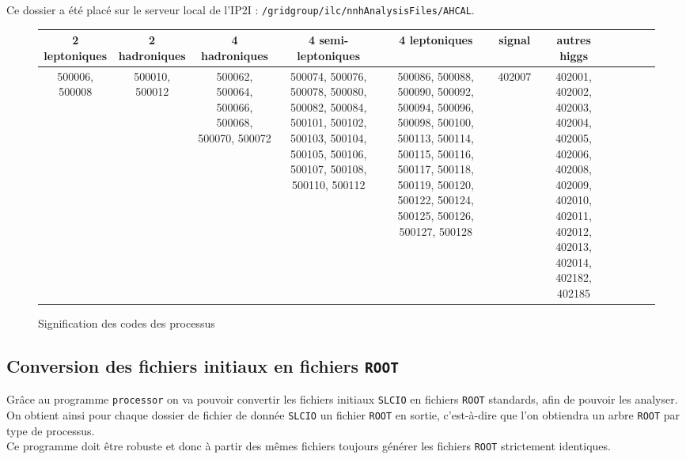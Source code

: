 \documentclass[10pt,a4paper]{report}
\newcommand{\cad}{c'est-à-dire\xspace}
\newcommand{\ROOT}{\texttt{ROOT}\xspace}
\newcommand{\SLCIO}{\texttt{SLCIO}\xspace}
\newcommand{\processor}{\texttt{processor}\xspace}
\begin{document}
Ce dossier a été placé sur le serveur local de l'IP2I : \texttt{/gridgroup/ilc/nnhAnalysisFiles/AHCAL}.

\begin{figure}[h!]
    \centering
    \begin{tabular}{ | c | c | c | c | c | c | c | c | c | c | c | }
        \hline
        2 leptoniques & 2 hadroniques & 4 hadroniques & 4 semi-leptoniques & 4 leptoniques & signal & autres higgs \\
        \hline
        500006, 500008 & 500010, 500012 & 500062, 500064, 500066, 500068, 500070, 500072 & 500074, 500076, 500078, 500080, 500082, 500084, 500101, 500102, 500103, 500104, 500105, 500106, 500107, 500108, 500110, 500112 & 500086, 500088, 500090, 500092, 500094, 500096, 500098, 500100,
        500113, 500114, 500115, 500116, 500117, 500118, 500119, 500120,
        500122, 500124, 500125, 500126, 500127, 500128 & 402007 & 402001, 402002, 402003, 402004, 402005, 402006, 402008, 402009, 402010, 402011, 402012, 402013, 402014, 402182, 402185 \\
        \hline
    \end{tabular}
    \caption{Signification des codes des processus}
    \label{data:def}
\end{figure}

    
    

\subsection{Conversion des fichiers initiaux en fichiers \ROOT}

Grâce au programme \processor on va pouvoir convertir les fichiers initiaux \SLCIO en fichiers \ROOT standards, afin de pouvoir les analyser.\\

On obtient ainsi pour chaque dossier de fichier de donnée \SLCIO un fichier \ROOT en sortie, \cad que l'on obtiendra un arbre \ROOT par type de processus.\\

Ce programme doit être robuste et donc à partir des mêmes fichiers toujours générer les fichiers \ROOT strictement identiques.
\end{document}
